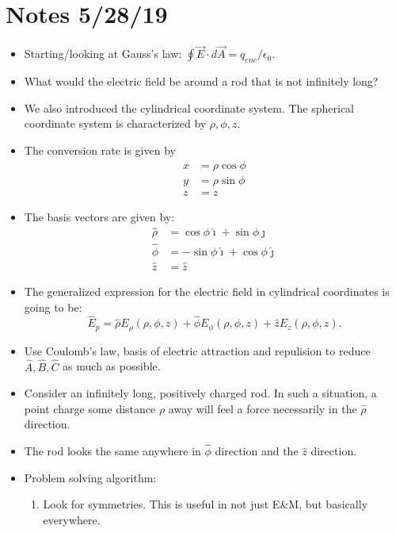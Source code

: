 \documentclass[12pt]{extreport}
\begin{document}
\section{Notes 5/28/19}
	\begin{itemize}
		\item Starting/looking at Gauss's law: $\oint \vec E \cdot d\vec A = q_{enc}/\epsilon_0.$

		\item What would the electric field be around a rod that is not infinitely long? 

		\item We also introduced the cylindrical coordinate system. The spherical coordinate system is characterized by $\rho, \phi, z.$ 

		\item The conversion rate is given by 
			\begin{align*}
				x &= \rho \cos \phi \\
				y &= \rho \sin \phi \\
				z &= z
			\end{align*}

		\item The basis vectors are given by: 
			\begin{align*}
				\hat \rho &= \cos \phi \hat \imath  + \sin \phi \hat \jmath \\
				\hat \phi &= -\sin \phi \hat \imath + \cos \phi \hat \jmath \\
				\hat z &= \hat z
			\end{align*}

		\item The generalized expression for the electric field in cylindrical coordinates is going to be: $$\hat E_p = \hat \rho E_\rho(\rho, \phi, z) + \hat \phi E_\phi(\rho, \phi, z) + \hat z E_z (\rho, \phi, z).$$

		\item Use Coulomb's law, basis of electric attraction and repulision to reduce $\hat A, \hat B, \hat C$ as much as possible.

		\item Consider an infinitely long, positively charged rod. In such a situation, a point charge some distance $\rho$ away will feel a force necessarily in the $\hat \rho$ direction.	

		\item The rod looks the same anywhere in $\hat \phi$ direction and the $\hat z$ direction.

		\item Problem solving algorithm:
			\begin{enumerate}
				\item Look for symmetries. This is useful in not just E\&M, but basically everywhere.


\end{enumerate}
\end{itemize}
\end{document}
